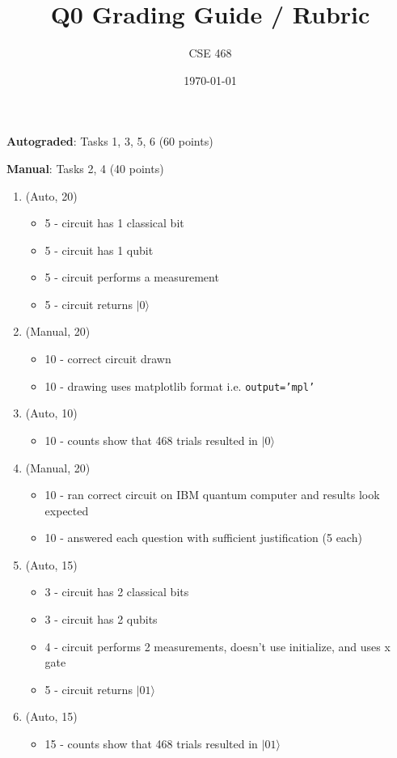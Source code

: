 \documentclass[12pt]{article}
\title{Q0 Grading Guide / Rubric}
\author{CSE 468}
\date{\today}
\begin{document}
\maketitle

\noindent \textbf{Autograded}: Tasks 1, 3, 5, 6 (60 points) 

\noindent \textbf{Manual}: Tasks 2, 4 (40 points)

\begin{enumerate}[font=\bfseries]
    \item (Auto, 20) 
    \begin{itemize}
        \item 5 - circuit has 1 classical bit
        \item 5 - circuit has 1 qubit
        \item 5 - circuit performs a measurement
        \item 5 - circuit returns $|0\rangle$
    \end{itemize}
    \item (Manual, 20)
    \begin{itemize}
        \item 10 - correct circuit drawn
        \item 10 - drawing uses matplotlib format i.e. \texttt{output='mpl'}
    \end{itemize}
    \item (Auto, 10) 
    \begin{itemize}
        \item 10 - counts show that 468 trials resulted in $|0\rangle$
    \end{itemize}
    \item (Manual, 20)
    \begin{itemize}
        \item 10 - ran correct circuit on IBM quantum computer and results look expected
        \item 10 - answered each question with sufficient justification (5 each)
    \end{itemize}
    \item (Auto, 15) 
    \begin{itemize}
        \item 3 - circuit has 2 classical bits
        \item 3 - circuit has 2 qubits
        \item 4 - circuit performs 2 measurements, doesn't use initialize, and uses x gate
        \item 5 - circuit returns $|01\rangle$
    \end{itemize}
    \item (Auto, 15) 
    \begin{itemize}
        \item 15 - counts show that 468 trials resulted in $|01\rangle$
    \end{itemize}
\end{enumerate}
\end{document}
